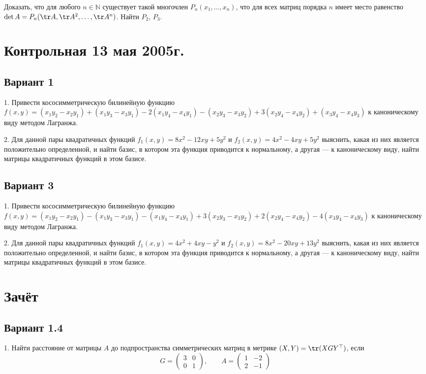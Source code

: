 \documentclass[a4paper]{article}
\newcommand{\No}{\textnumero}
\begin{document}
Доказать, что для любого $n\in \mathbb{N}$ существует такой
многочлен $P_n(x_1, \ldots, x_n)$, что для всех матриц порядка $n$
имеет место равенство $\det A=P_n(\tr A, \tr A^2,\ldots, \tr
A^n)$. Найти $P_2$, $P_3$.

\section{Контрольная 13 мая 2005г.}

\subsection{Вариант 1}

1. Привести кососимметрическую билинейную функцию $f(x,
y)=(x_1y_2-x_2y_1)+(x_1y_3-x_3y_1)-2(x_1y_4-x_4y_1)-(x_2y_3-x_3y_2)+3(x_2y_4-x_4y_2)+(x_3y_4-x_4y_3)$
к каноническому виду методом Лагранжа.

2. Для данной пары квадратичных функций $f_1(x, y)=8x^2-12xy+5y^2$
и $f_2(x, y)=4x^2-4xy+5y^2$ выяснить, какая из них является
положительно определенной, и найти базис, в котором эта функция
приводится к нормальному, а другая
--- к каноническому виду, найти матрицы квадратичных функций в
этом базисе.

\subsection{Вариант 3}

1. Привести кососимметрическую билинейную функцию $f(x,
y)=(x_1y_2-x_2y_1)-(x_1y_3-x_3y_1)-(x_1y_4-x_4y_1)+3(x_2y_3-x_3y_2)+2(x_2y_4-x_4y_2)-4(x_3y_4-x_4y_3)$
к каноническому виду методом Лагранжа.

2. Для данной пары квадратичных функций $f_1(x, y)=4x^2+4xy-y^2$ и
$f_2(x, y)=8x^2-20xy+13y^2$ выяснить, какая из них является
положительно определенной, и найти базис, в котором эта функция
приводится к нормальному, а другая
--- к каноническому виду, найти матрицы квадратичных функций в
этом базисе.

\section{Зачёт \No 1}

\subsection{Вариант 1.4}

1. Найти расстояние от матрицы $A$ до подпространства
симметрических матриц в мет\-ри\-ке $(X, Y)=\tr (XGY^\top)$, если
$$
G=\left(\begin{array}{rr} 3 & 0\\
0 & 1
\end{array}\right) ,\qquad
A=\left(
\begin{array}{rr} 1 & -2\\
2 & -1
\end{array}\right)
$$
\end{document}
